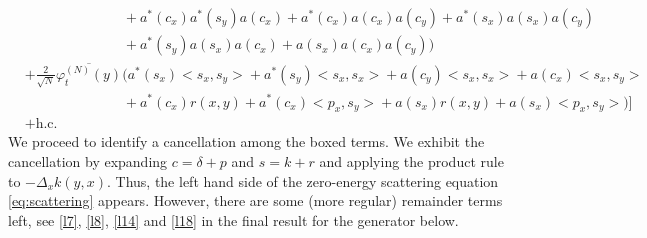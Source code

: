 \documentclass[11pt,a4paper,draft,DIV11]{scrartcl}	%
\newcommand{\hc}{\mbox{h.c.}}		%
\newcommand{\scal}[2]{\big<#1,#2\big>} %
\newcommand{\cc}[1]{\overline{#1}}	%
\newcommand{\ph}{\varphi_t^{(N)}}	%
\newcommand{\eqr}[1]{\eqref{eq:#1}}			%
\begin{document}
\begin{align*}
					    & \qquad\qquad\qquad\quad + a^*(c_x) a^*(s_y) a(c_x) + a^*(c_x) a(c_x) a(c_y)+ a^*(s_x) a(s_x) a(c_y) \\
					    & \qquad\qquad\qquad\quad + a^*(s_y) a(s_x) a(c_x) + a(s_x) a(c_x) a(c_y)    \bigg) \\
& + \frac{2}{\sqrt{N}}\cc{\ph(y)} \bigg(    a^*(s_x) \scal{s_x}{s_y} + a^*(s_y) \scal{s_x}{s_x}  + a(c_y) \scal{s_x}{s_x} + a(c_x) \scal{s_x}{s_y} \\
					    & \qquad\qquad\qquad\quad + a^*(c_x)r(x,y) + a^*(c_x)\scal{p_x}{s_y} + a(s_x)r(x,y) + a(s_x)\scal{p_x}{s_y}		\bigg)    \Big]\\
& + \hc
\end{align*}
We proceed to identify a cancellation among the boxed terms. We exhibit the
cancellation by expanding $c = \delta + p$ and $s = k + r$ and applying the
product rule to $-\Delta_x k(y,x)$. Thus, the left hand side of the zero-energy scattering equation \eqr{scattering} appears. However, there are some (more regular) remainder terms left, see \eqref{l7}, \eqref{l8}, \eqref{l14} and \eqref{l18} in the final result for the generator below.
\end{document}
